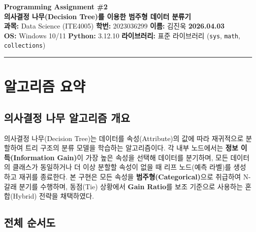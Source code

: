 \documentclass[12pt, a4paper]{article}
\begin{document}
\begin{center}
    {\Large\bfseries Programming Assignment \#2}\\[0.4em]
    {\large\bfseries 의사결정 나무(Decision Tree)를 이용한 범주형 데이터 분류기}\\[1em]
    {\normalsize
        \textbf{과목:} Data Science (ITE4005) \quad
        \textbf{학번:} 2023036299 \quad
        \textbf{이름:} 김진욱 \quad
        \textbf{2026.04.03}\\[0.3em]
        \textbf{OS:} Windows 10/11 \quad
        \textbf{Python:} 3.12.10 \quad
        \textbf{라이브러리:} 표준 라이브러리 (\texttt{sys}, \texttt{math}, \texttt{collections})
    }
\end{center}
\vspace{0.5em}
\hrule
\vspace{1em}

\section{알고리즘 요약}

\subsection{의사결정 나무 알고리즘 개요}

의사결정 나무(Decision Tree)는 데이터를 속성(Attribute)의 값에 따라 재귀적으로 분할하여 트리 구조의 분류 모델을 학습하는 알고리즘이다. 각 내부 노드에서는 \textbf{정보 이득(Information Gain)}이 가장 높은 속성을 선택해 데이터를 분기하며, 모든 데이터의 클래스가 동일하거나 더 이상 분할할 속성이 없을 때 리프 노드(예측 라벨)를 생성하고 재귀를 종료한다. 본 구현은 모든 속성을 \textbf{범주형(Categorical)}으로 취급하여 N-갈래 분기를 수행하며, 동점(Tie) 상황에서 \textbf{Gain Ratio}를 보조 기준으로 사용하는 혼합(Hybrid) 전략을 채택하였다.

\subsection{전체 순서도}
\end{document}
